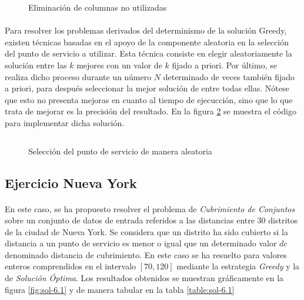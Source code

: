 \documentclass[spanish]{article}
\begin{document}
		\begin{figure}[h]
			\centering
			\inputminted{basic}{./code/column-deletion.mos}
			\caption{Eliminación de columnas no utilizadas}
			\label{code:column-deletion}
		\end{figure}

		\paragraph{}
		Para resolver los problemas derivados del determinismo de la solución Greedy, existen técnicas basadas en el apoyo de la componente aleatoria en la selección del punto de servicio a utilizar. Esta técnica consiste en elegir aleatoriamente la solución entre las $k$ mejores con un valor de $k$ fijado a priori. Por último, se realiza dicho proceso durante un número $N$ determinado de veces también fijado a priori, para después seleccionar la mejor solución de entre todas ellas. Nótese que esto no presenta mejoras en cuanto al tiempo de ejecucción, sino que lo que trata de mejorar es la precisión del resultado. En la figura \ref{code:random-greedy} se muestra el código para implementar dicha solución.

		\begin{figure}[h]
			\centering
			\inputminted{basic}{./code/random-greedy.mos}
			\caption{Selección del punto de servicio de manera aleatoria}
			\label{code:random-greedy}
		\end{figure}


		\subsection{Ejercicio Nueva York}
		\label{sec:e-6.1}

			\paragraph{}
			En este caso, se ha propuesto resolver el problema de \emph{Cubrimiento de Conjuntos} sobre un conjunto de datos de entrada referidos a las distancias entre $30$ distritos de la ciudad de Nueva York. Se considera que un distrito ha sido cubierto si la distancia a un punto de servicio es menor o igual que un determinado valor $dc$ denominado distancia de cubrimiento. En este caso se ha resuelto para valores enteros comprendidos en el intervalo $[70, 120]$ mediante la estrategia \emph{Greedy} y la de \emph{Solución Óptima}. Los resultados obtenidos se muestran gráficamente en la figura \ref{fig:sol-6.1} y de manera tabular en la tabla \ref{table:sol-6.1}
\end{document}
